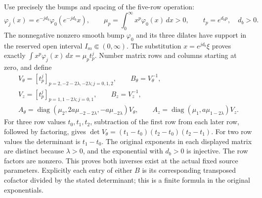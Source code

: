 Use precisely the bumps and spacing of the five-row operation:
\[
 \varphi_j(x)=e^{-jd_b}\varphi_0(e^{-jd_b}x),\qquad
 \mu_p=\int_0^\infty x^p\varphi_0(x)\,dx>0,
 \qquad t_p=e^{d_bp},\quad d_b>0.
\]
The nonnegative nonzero smooth bump \(\varphi_0\) and its three
dilates have support in the reserved open interval \(I_m\Subset(0,\infty)\).
The substitution \(x=e^{jd_b}\xi\) proves exactly
\(\int x^p\varphi_j(x)\,dx=\mu_p t_p^j\).
Number matrix rows and columns starting at zero, and define
\begin{equation}\label{mcmean:vandermonde}
\begin{gathered}
 V_\theta=[t_p^j]_{p=2,-2-2\lambda,-2\lambda; j=0,1,2},
 \qquad B_\theta=V_\theta^{-1},\\
 V_z=[t_p^j]_{p=1,1-2\lambda; j=0,1},
 \qquad B_z=V_z^{-1},\\
 A_\theta=\operatorname{diag}
  (\mu_2,2a\mu_{-2-2\lambda},-a\mu_{-2\lambda})V_\theta,
 \qquad
 A_z=\operatorname{diag}(\mu_1,a\mu_{1-2\lambda})V_z.
\end{gathered}
\end{equation}
For three row values \(t_0,t_1,t_2\), subtraction of the first row
from each later row, followed by factoring, gives
\(\det V_\theta=(t_1-t_0)(t_2-t_0)(t_2-t_1)\).
For two row values the determinant is \(t_1-t_0\).
The original exponents in each displayed matrix are distinct because
\(\lambda>0\), and the exponential with \(d_b>0\) is injective.
The row factors are nonzero. This proves both inverses exist at the
actual fixed source parameters. Explicitly each entry of either
\(B\) is its corresponding transposed cofactor divided by the stated
determinant; this is a finite formula in the original exponentials.

